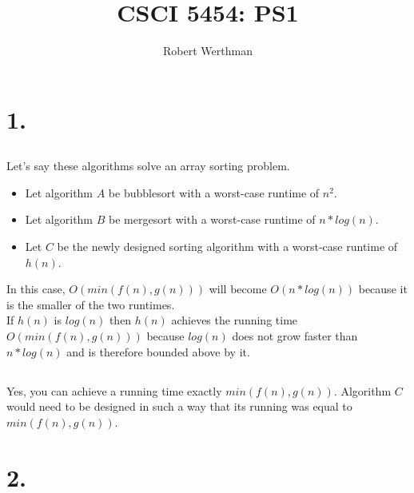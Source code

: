 \documentclass[12pt]{article}
\begin{document}
\title{CSCI 5454: PS1}
\author{Robert Werthman}
\date{}
\maketitle

\section*{1.}

\subsection*{}
Let's say these algorithms solve an array sorting problem.\\
\begin{itemize}
\item Let algorithm $A$ be bubblesort with a worst-case runtime of $n^2$.\\
\item Let algorithm $B$ be mergesort with a worst-case runtime of $n*log(n)$.\\
\item Let $C$ be the newly designed sorting algorithm with a worst-case runtime of $h(n)$.\\
\end{itemize}
In this case, $O(min(f(n),g(n)))$ will become $O(n*log(n))$ because it is the smaller of the two runtimes.\\
If $h(n)$ is $log(n)$ then $h(n)$ achieves the running time $O(min(f(n),g(n)))$ because $log(n)$ does not grow faster than $n*log(n)$ and is therefore bounded above by it.\\

\subsection*{}
Yes, you can achieve a running time exactly $min(f(n),g(n))$. Algorithm $C$ would need to be designed in such a way that its running was equal to $min(f(n),g(n))$.\\

\section*{2.}
\end{document}
